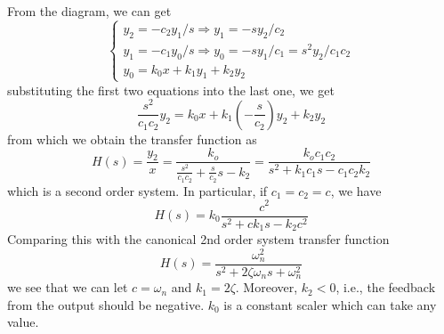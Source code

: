 \begin{itemize}
From the diagram, we can get
\[
\left\{ \begin{array}{ll}
	y_2=-c_2y_1/s  \Longrightarrow  y_1=-sy_2/c_2 \\
	y_1=-c_1y_0/s  \Longrightarrow y_0=-sy_1/c_1=s^2y_2/c_1c_2 \\
	y_0=k_0 x+k_1y_1+k_2y_2 
	\end{array} \right.
\]
substituting the first two equations into the last one, we get
\[	\frac{s^2}{c_1c_2} y_2=k_0x+k_1(-\frac{s}{c_2})y_2+k_2y_2 \]
from which we obtain the transfer function as
\[
H(s)=\frac{y_2}{x}=\frac{k_o}{\frac{s^2}{c_1c_2}+\frac{s}{c_2}s-k_2}
	=\frac{k_oc_1c_2}{s^2+k_1c_1s-c_1c_2k_2}
\]
which is a second order system. In particular, if $c_1=c_2=c$, we have
\[
	H(s)=k_0\frac{c^2}{s^2+c k_1s-k_2c^2}
\]
Comparing this with the canonical 2nd order system transfer function
\[
	H(s)=\frac{\omega_n^2}{s^2+2\zeta \omega_n s+\omega_n^2}
\]
we see that we can let $c=\omega_n$ and $k_1=2\zeta$. Moreover, $k_2<0$, 
i.e., the feedback from the output should be negative. $k_0$ is a constant
scaler which can take any value.
	
\end{itemize}




	

	












